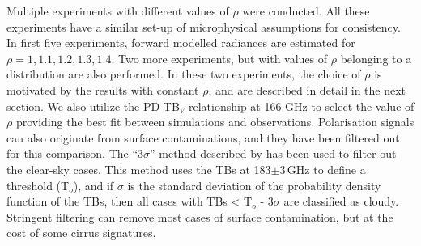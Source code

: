 \documentclass[amt, manuscript]{copernicus}
\begin{document}
Multiple experiments with different values of $\rho$ were conducted. All these experiments have a similar set-up of microphysical assumptions for consistency. In first five experiments, forward modelled radiances are estimated for $\rho = 1,1.1, 1.2, 1.3, 1.4$. Two more experiments, but with values of $\rho$ belonging to a distribution are also performed. In these two experiments, the choice of $\rho$ is motivated by the results with constant $\rho$, and are described in detail in the next section. We also utilize the PD-TB$_V$ relationship at 166\,\,GHz to select the value of $\rho$ providing the best fit between simulations and observations. Polarisation signals can also originate from surface contaminations, and they have been filtered out for this comparison.  The  ``3$\sigma$'' method described by \citet{gong:micro:17} has been used to filter out the clear-sky cases. This method uses the TBs at 183$\pm$3\,GHz to define a threshold (T$_o$), and if  $\sigma$ is the standard deviation of the probability density function of the TBs, then all cases with TBs < T$_o$ - 3$\sigma$ are classified as cloudy. Stringent filtering can remove most cases of surface contamination, but at the cost of some cirrus signatures.


\end{document}
